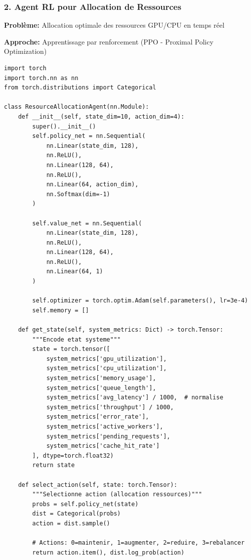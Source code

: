 \documentclass[12pt,a4paper]{article}
\begin{document}
\subsubsection{2. Agent RL pour Allocation de Ressources}

\textbf{Problème:} Allocation optimale des ressources GPU/CPU en temps réel

\textbf{Approche:} Apprentissage par renforcement (PPO - Proximal Policy Optimization)

\begin{lstlisting}[caption={Agent RL pour Resource Allocation}]
import torch
import torch.nn as nn
from torch.distributions import Categorical

class ResourceAllocationAgent(nn.Module):
    def __init__(self, state_dim=10, action_dim=4):
        super().__init__()
        self.policy_net = nn.Sequential(
            nn.Linear(state_dim, 128),
            nn.ReLU(),
            nn.Linear(128, 64),
            nn.ReLU(),
            nn.Linear(64, action_dim),
            nn.Softmax(dim=-1)
        )
        
        self.value_net = nn.Sequential(
            nn.Linear(state_dim, 128),
            nn.ReLU(),
            nn.Linear(128, 64),
            nn.ReLU(),
            nn.Linear(64, 1)
        )
        
        self.optimizer = torch.optim.Adam(self.parameters(), lr=3e-4)
        self.memory = []
        
    def get_state(self, system_metrics: Dict) -> torch.Tensor:
        """Encode etat systeme"""
        state = torch.tensor([
            system_metrics['gpu_utilization'],
            system_metrics['cpu_utilization'],
            system_metrics['memory_usage'],
            system_metrics['queue_length'],
            system_metrics['avg_latency'] / 1000,  # normalise
            system_metrics['throughput'] / 1000,
            system_metrics['error_rate'],
            system_metrics['active_workers'],
            system_metrics['pending_requests'],
            system_metrics['cache_hit_rate']
        ], dtype=torch.float32)
        return state
        
    def select_action(self, state: torch.Tensor):
        """Selectionne action (allocation ressources)"""
        probs = self.policy_net(state)
        dist = Categorical(probs)
        action = dist.sample()
        
        # Actions: 0=maintenir, 1=augmenter, 2=reduire, 3=rebalancer
        return action.item(), dist.log_prob(action)
        

\end{lstlisting}
\end{document}
